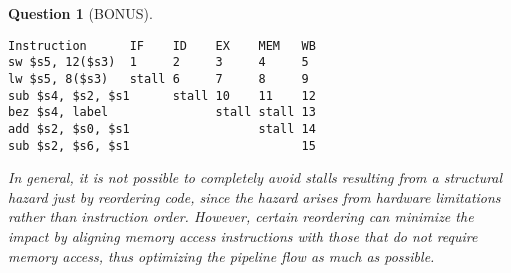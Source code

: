 \documentclass{article}
\theoremstyle{questionstyle}
\newtheorem{q}{Question}
\begin{document}
\begin{q}[BONUS]\leavevmode

\begin{verbatim}
Instruction      IF    ID    EX    MEM   WB
sw $s5, 12($s3)  1     2     3     4     5
lw $s5, 8($s3)   stall 6     7     8     9
sub $s4, $s2, $s1      stall 10    11    12
bez $s4, label               stall stall 13
add $s2, $s0, $s1                  stall 14
sub $s2, $s6, $s1                        15
\end{verbatim}

In general, it is not possible to completely avoid stalls resulting from a structural hazard just by reordering code, since the hazard arises from hardware limitations rather than instruction order. However, certain reordering can minimize the impact by aligning memory access instructions with those that do not require memory access, thus optimizing the pipeline flow as much as possible.
\end{q}
\end{document}
